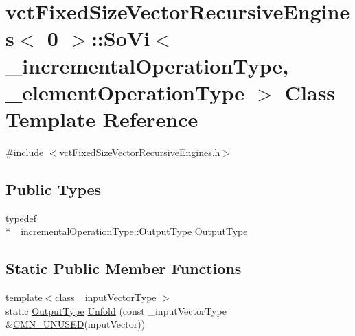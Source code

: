 \hypertarget{classvct_fixed_size_vector_recursive_engines_3_010_01_4_1_1_so_vi}{\section{vct\-Fixed\-Size\-Vector\-Recursive\-Engines$<$ 0 $>$\-:\-:So\-Vi$<$ \-\_\-incremental\-Operation\-Type, \-\_\-element\-Operation\-Type $>$ Class Template Reference}
\label{classvct_fixed_size_vector_recursive_engines_3_010_01_4_1_1_so_vi}
}


{\ttfamily \#include $<$vct\-Fixed\-Size\-Vector\-Recursive\-Engines.\-h$>$}

\subsection*{Public Types}
\begin{DoxyCompactItemize}
\item 
typedef \\*
\-\_\-incremental\-Operation\-Type\-::\-Output\-Type \hyperlink{classvct_fixed_size_vector_recursive_engines_3_010_01_4_1_1_so_vi_aa27e2cc5e89fd284608b25bb66a5047b}{Output\-Type}
\end{DoxyCompactItemize}
\subsection*{Static Public Member Functions}
\begin{DoxyCompactItemize}
\item 
{\footnotesize template$<$class \-\_\-input\-Vector\-Type $>$ }\\static \hyperlink{classvct_fixed_size_vector_recursive_engines_3_010_01_4_1_1_so_vi_aa27e2cc5e89fd284608b25bb66a5047b}{Output\-Type} \hyperlink{classvct_fixed_size_vector_recursive_engines_3_010_01_4_1_1_so_vi_a46b9db368fdc70084577433bc260597d}{Unfold} (const \-\_\-input\-Vector\-Type \&\hyperlink{cmn_portability_8h_a021894e2626935fa2305434b1e893ff6}{C\-M\-N\-\_\-\-U\-N\-U\-S\-E\-D}(input\-Vector))
\end{DoxyCompactItemize}


